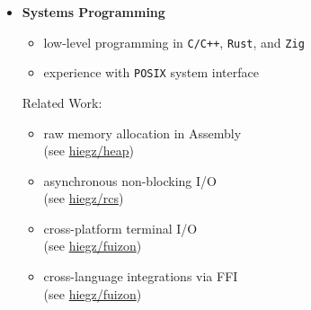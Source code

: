 \documentclass[]{article}
\begin{document}
\begin{minipage}[t]{0.49\linewidth}
    \begin{itemize}[leftmargin=0.15in, rightmargin=0.15in, label={}]
        \item {\large\bfseries Systems Programming}

            \begin{itemize}
                \item low-level programming in \verb|C/C++|, \verb|Rust|, and \verb|Zig|
                \item experience with \verb|POSIX| system interface
            \end{itemize}
            Related Work:
            \begin{itemize}
                \item raw memory allocation in Assembly \\
                    (see \href{https://github.com/hiegz/heap}{\ttfamily hiegz/heap})
                \item asynchronous non-blocking I/O \\
                    (see \href{https://github.com/hiegz/rcs}{\ttfamily hiegz/rcs})
                \item cross-platform terminal I/O \\
                    (see \href{https://github.com/hiegz/fuizon}{\ttfamily hiegz/fuizon})
                \item cross-language integrations via FFI \\
                    (see \href{https://github.com/hiegz/crossterm-ffi}{\ttfamily hiegz/fuizon})
            \end{itemize}
    \end{itemize}
\end{minipage}
\hspace{10pt}
\end{document}
